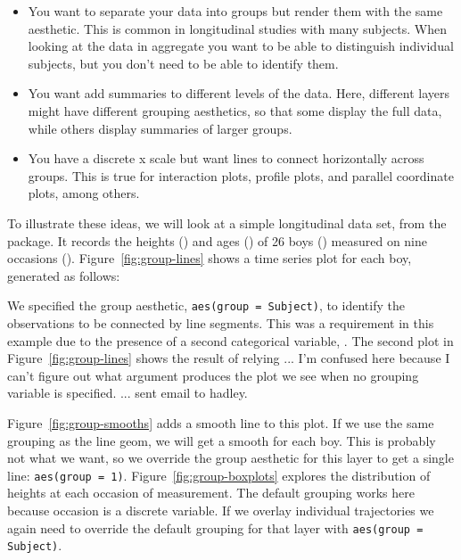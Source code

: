 \begin{itemize}
  \item You want to separate your data into groups but render them with the same aesthetic.  This is common in longitudinal studies with many subjects.  When looking at the data in aggregate you want to be able to distinguish individual subjects, but you don't need to be able to identify them.
  
  \item You want add summaries to different levels of the data. Here, different layers might have different grouping aesthetics, so that some display the full data, while others display summaries of larger groups.


  \item You have a discrete x scale but want lines to connect horizontally across groups.  This is true for interaction plots, profile plots, and parallel coordinate plots, among others.
  
\end{itemize}

To illustrate these ideas, we will look at a simple longitudinal data set,  from the  package.  It records the heights () and ages () of 26 boys () measured on nine occasions (). Figure~\ref{fig:group-lines} shows a time series plot for each boy, generated as follows:


\noindent We specified the group aesthetic, {\tt aes(group = Subject)}, to identify the observations to be connected by line segments.  This was a requirement in this example due to the presence of a second categorical variable, .  The second plot in  Figure~\ref{fig:group-lines} shows the result of relying  ...  I'm confused here because I can't figure out what argument produces the plot we see when no grouping variable is specified. ... sent email to hadley.

Figure~\ref{fig:group-smooths} adds
a smooth line to this plot.  If we use the same grouping as the line
geom, we will get a smooth for each boy.  This is probably not what we
want, so we override the group aesthetic for this layer to get a
single line: {\tt aes(group = 1)}.  Figure~\ref{fig:group-boxplots}
explores the distribution of heights at each occasion of measurement.
The default grouping works here because occasion is a discrete
variable.  If we overlay individual trajectories we again need to
override the default grouping for that layer with {\tt aes(group =
Subject)}.

